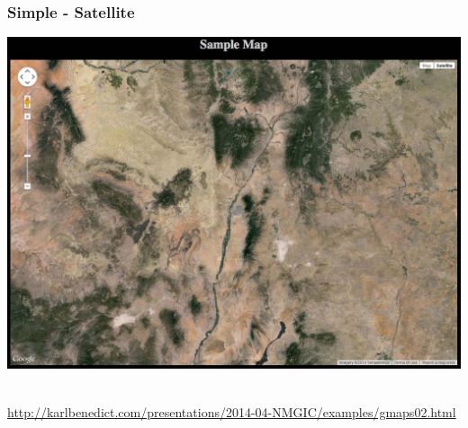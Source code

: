 \documentclass[]{article}
\begin{document}
\subsubsection{Simple - Satellite}\label{simple---satellite}

\includegraphics{images/google_02.jpg}~

\url{http://karlbenedict.com/presentations/2014-04-NMGIC/examples/gmaps02.html}
\end{document}
